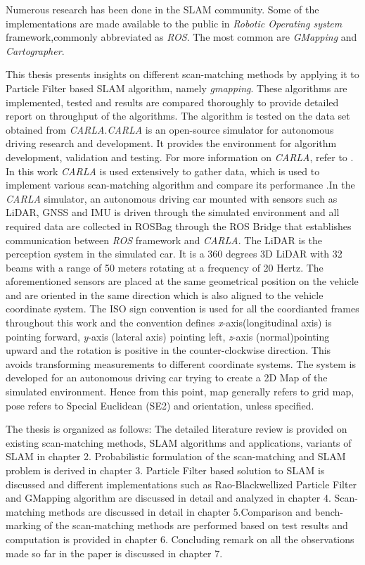 Numerous research has been done in the SLAM community. Some of the implementations are made available to the public in \textit{Robotic Operating system} framework,commonly abbreviated as \textit{ROS}. The most common are \textit{GMapping}\cite{gmap_ros} and \textit{Cartographer}\cite{cartographer_ros}.

This thesis presents insights on different scan-matching methods by applying it to Particle Filter based SLAM algorithm, namely \textit{gmapping}. These algorithms are implemented, tested and results are compared thoroughly to provide detailed report on throughput of the algorithms. The algorithm is tested on the data set obtained from \textit{CARLA}\cite{Dosovitskiy17}.\textit{CARLA} is an open-source simulator for autonomous driving research and development. It provides the environment for algorithm development, validation and testing. For more information on \textit{CARLA}, refer to \cite{Dosovitskiy17}. In this work  \textit{CARLA} is used extensively to gather data, which is used to implement various scan-matching algorithm and compare its performance .In the \textit{CARLA} simulator, an autonomous driving car mounted with sensors such as LiDAR, GNSS and IMU is driven through the simulated environment and all required data are collected in ROSBag through the ROS Bridge that establishes communication between  \textit{ROS} framework and \textit{CARLA}. The LiDAR is the perception system in the simulated car. It is a 360 degrees 3D LiDAR with 32 beams with a range of 50 meters rotating at a  frequency of 20 Hertz. The aforementioned sensors are placed at the same geometrical position on the vehicle and are oriented in the same direction which is also aligned to the vehicle coordinate system. The ISO sign convention is used for all the coordianted frames throughout this work and the convention defines  \textit{x}-axis(longitudinal axis) is pointing forward,  \textit{y}-axis (lateral axis) pointing left,  \textit{z}-axis (normal)pointing upward and the rotation is positive in the counter-clockwise direction. This avoids transforming measurements to different coordinate systems. The system is developed for an autonomous driving car trying to create a 2D Map of the simulated environment. Hence from this point, map generally refers to grid map, pose refers to Special Euclidean (SE2) and orientation, unless specified. 

 The thesis is organized as follows: The detailed literature review is provided on existing scan-matching methods, SLAM algorithms and applications, variants of SLAM in chapter 2. Probabilistic formulation of the scan-matching and SLAM problem is derived in chapter 3. Particle Filter based solution to SLAM is discussed and different implementations such as Rao-Blackwellized Particle Filter and GMapping algorithm are discussed in detail and analyzed in chapter 4. Scan-matching methods are discussed in detail in chapter 5.Comparison and bench-marking of the scan-matching methods are performed based on test results and computation is provided in chapter 6. Concluding remark on all the observations made so far in the paper is discussed in chapter 7.